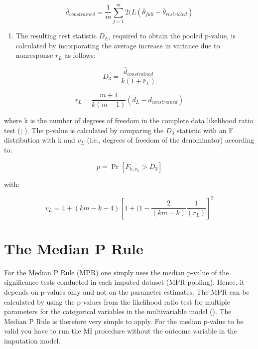 \documentclass[]{book}
\providecommand{\tightlist}{%
  \setlength{\itemsep}{0pt}\setlength{\parskip}{0pt}}
\begin{document}
\[\bar d_{constrained} = \frac{1}{m} \sum_{j=1}^m 2(L(\bar\theta_{full} - \bar\theta_{restricted})\]

\begin{enumerate}
\def\labelenumi{\arabic{enumi}.}
\setcounter{enumi}{4}
\tightlist
\item
  The resulting test statistic \(D_L\), required to obtain the pooled
  p-value, is calculated by incorporating the average increase in
  variance due to nonresponse \(\bar r_L\) as follows:
\end{enumerate}

\[D_3 = \frac{\bar d_{constrained}}{k(1+\bar r_L)}\]

\[\bar r_L = \frac{m+1}{k(m-1)}(\bar d_L-\bar d_{constrained})\]

where k is the number of degrees of freedom in the complete data
likelihood ratio test (\citet{Mistler2013}; \citet{VanBuuren2018}). The
p-value is calculated by comparing the \(D_3\) statistic with an F
distribution with k and \(v_L\) (i.e., degrees of freedom of the
denominator) according to:

\[p = \Pr[F_{k,\nu_L}>D_3]\]

with:

\[v_L = 4 + (km-k-4)[1+(1-\frac{2}{(km-k)}\frac{1}{(r_L)}]^2\]

\section{The Median P Rule}\label{the-median-p-rule}

For the Median P Rule (MPR) one simply uses the median p-value of the
significance tests conducted in each imputed dataset (MPR pooling).
Hence, it depends on p-values only and not on the parameter estimates.
The MPR can be calculated by using the p-values from the likelihood
ratio test for multiple parameters for the categorical variables in the
multivariable model (\citet{Eekhout2017}). The Median P Rule is
therefore very simple to apply. For the median p-value to be valid you
have to run the MI procedure without the outcome variable in the
imputation model.


\end{document}

